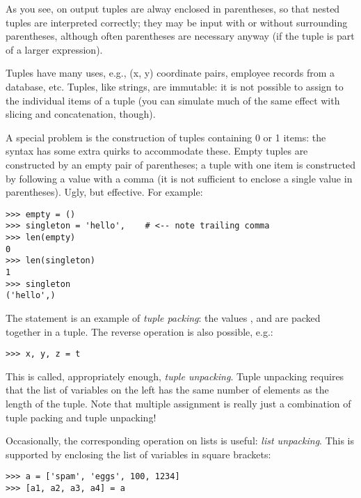 \documentclass{manual}
\begin{document}
As you see, on output tuples are alway enclosed in parentheses, so
that nested tuples are interpreted correctly; they may be input with
or without surrounding parentheses, although often parentheses are
necessary anyway (if the tuple is part of a larger expression).

Tuples have many uses, e.g., (x, y) coordinate pairs, employee records
from a database, etc.  Tuples, like strings, are immutable: it is not
possible to assign to the individual items of a tuple (you can
simulate much of the same effect with slicing and concatenation,
though).

A special problem is the construction of tuples containing 0 or 1
items: the syntax has some extra quirks to accommodate these.  Empty
tuples are constructed by an empty pair of parentheses; a tuple with
one item is constructed by following a value with a comma
(it is not sufficient to enclose a single value in parentheses).
Ugly, but effective.  For example:

\begin{verbatim}
>>> empty = ()
>>> singleton = 'hello',    # <-- note trailing comma
>>> len(empty)
0
>>> len(singleton)
1
>>> singleton
('hello',)
\end{verbatim}

The statement  is an example of
\emph{tuple packing}: the values ,  and
 are packed together in a tuple.  The reverse operation
is also possible, e.g.:

\begin{verbatim}
>>> x, y, z = t
\end{verbatim}

This is called, appropriately enough, \emph{tuple unpacking}.  Tuple
unpacking requires that the list of variables on the left has the same
number of elements as the length of the tuple.  Note that multiple
assignment is really just a combination of tuple packing and tuple
unpacking!

Occasionally, the corresponding operation on lists is useful: \emph{list
unpacking}.  This is supported by enclosing the list of variables in
square brackets:

\begin{verbatim}
>>> a = ['spam', 'eggs', 100, 1234]
>>> [a1, a2, a3, a4] = a
\end{verbatim}

\end{document}
